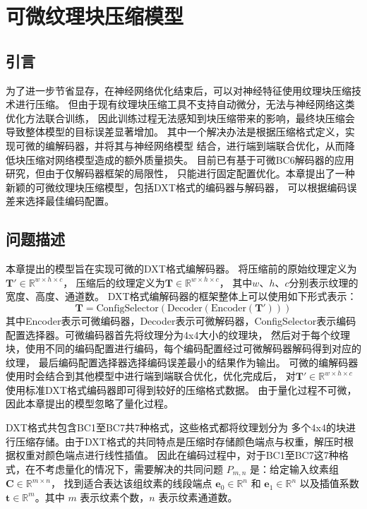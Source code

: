 
\chapter{可微纹理块压缩模型}

\section{引言}

为了进一步节省显存，在神经网络优化结束后，可以对神经特征使用纹理块压缩技术进行压缩。
但由于现有纹理块压缩工具不支持自动微分，无法与神经网络这类优化方法联合训练，
因此训练过程无法感知到块压缩带来的影响，最终块压缩会导致整体模型的目标误差显著增加。
其中一个解决办法是根据压缩格式定义，实现可微的编解码器，并将其与神经网络模型
结合，进行端到端联合优化，从而降低块压缩对网络模型造成的额外质量损失。
目前已有基于可微BC6解码器的应用研究，但由于仅解码器框架的局限性，
只能进行固定配置优化。本章提出了一种新颖的可微纹理块压缩模型，包括DXT格式的编码器与解码器，
可以根据编码误差来选择最佳编码配置。

\section{问题描述}
\label{问题描述}

本章提出的模型旨在实现可微的DXT格式编解码器。
将压缩前的原始纹理定义为$\mathbf{T}'\in \mathbb{R}^{w\times h\times c}$，
压缩后的纹理定义为$\mathbf{T}\in \mathbb{R}^{w\times h\times c}$，
其中$w$、$h$、$c$分别表示纹理的宽度、高度、通道数。
DXT格式编解码器的框架整体上可以使用如下形式表示：
\begin{equation}
    \mathbf{T}=\text{ConfigSelector}(\text{Decoder}(\text{Encoder}(\mathbf{T}')))
\end{equation}
其中Encoder表示可微编码器，Decoder表示可微解码器，ConfigSelector表示编码配置选择器。可微编码器首先将纹理分为4x4大小的纹理块，
然后对于每个纹理块，使用不同的编码配置进行编码，每个编码配置经过可微解码器解码得到对应的纹理，
最后编码配置选择器选择编码误差最小的结果作为输出。
可微的编解码器使用时会结合到其他模型中进行端到端联合优化，优化完成后，
对$\mathbf{T}'\in \mathbb{R}^{w\times h\times c}$使用标准DXT格式编码器即可得到较好的压缩格式数据。
由于量化过程不可微，因此本章提出的模型忽略了量化过程。

DXT格式共包含BC1至BC7共7种格式，这些格式都将纹理划分为
多个4x4的块进行压缩存储。由于DXT格式的共同特点是压缩时存储颜色端点与权重，解压时根据权重对颜色端点进行线性插值。
因此在编码过程中，对于BC1至BC7这7种格式，在不考虑量化的情况下，需要解决的共同问题 $P_{m,n}$ 是：给定输入纹素组 $\mathbf{C}\in\mathbb{R}^{m\times n}$，
找到适合表达该组纹素的线段端点 $\mathbf{e}_0\in\mathbb{R}^n$ 和 $\mathbf{e}_1\in\mathbb{R}^n$ 
以及插值系数 $\mathbf{t}\in\mathbb{R}^m$。其中 $m$ 表示纹素个数，$n$ 表示纹素通道数。


